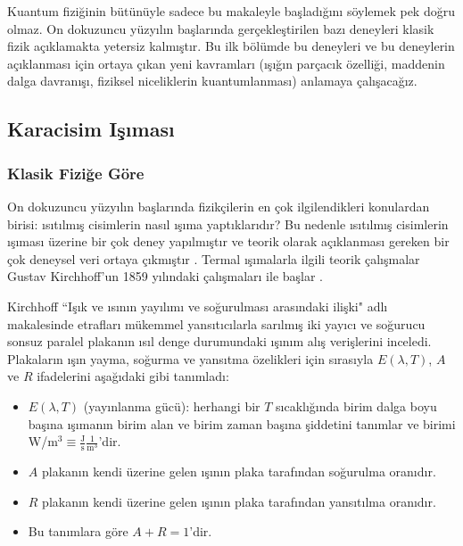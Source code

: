 \documentclass[a4paper,12pt, twoside]{article}
\begin{document}
Kuantum fiziğinin bütünüyle sadece bu makaleyle başladığını söylemek pek doğru olmaz. On dokuzuncu yüzyılın başlarında gerçekleştirilen bazı deneyleri klasik fizik açıklamakta yetersiz kalmıştır. Bu ilk bölümde bu deneyleri ve bu deneylerin açıklanması için ortaya çıkan yeni kavramları (ışığın parçacık özelliği, maddenin dalga davranışı, fiziksel niceliklerin kuantumlanması) anlamaya çalışacağız. 


\subsection{Karacisim Işıması}



\subsubsection{Klasik Fiziğe Göre}
On dokuzuncu yüzyılın başlarında fizikçilerin en çok ilgilendikleri konulardan birisi:
ısıtılmış cisimlerin nasıl ışıma yaptıklarıdır? Bu nedenle ısıtılmış cisimlerin ışıması üzerine bir çok deney yapılmıştır ve teorik olarak açıklanması gereken bir çok deneysel veri ortaya çıkmıştır \cite{book:Sharkov}. Termal ışımalarla ilgili teorik çalışmalar Gustav Kirchhoff'un 1859 yılındaki çalışmaları ile başlar \cite{book:Gasiorowicz}. 

Kirchhoff ``Işık ve ısının yayılımı ve soğurulması arasındaki ilişki" \cite{book:Jammer, Kirchhoff1859} adlı makalesinde etrafları mükemmel yansıtıcılarla sarılmış iki yayıcı ve soğurucu sonsuz paralel plakanın ısıl denge durumundaki ışınım alış verişlerini inceledi. Plakaların ışın yayma, soğurma ve yansıtma özelikleri için sırasıyla $E(\lambda, T)$, $A$ ve $R$ ifadelerini aşağıdaki gibi tanımladı:

\begin{itemize}
\item $E(\lambda, T)$ (yayınlanma gücü): herhangi bir $T$ sıcaklığında  birim dalga boyu başına ışımanın birim alan ve birim zaman başına şiddetini tanımlar ve birimi W/m$^3\equiv \frac{\text{J}}{\text{s}} \frac{1}{\text{m}^3}$'dir.
\item $A$ plakanın kendi üzerine gelen ışının plaka tarafından soğurulma oranıdır.
\item $R$ plakanın kendi üzerine gelen ışının plaka tarafından yansıtılma  oranıdır.
\item Bu tanımlara göre $A + R = 1$'dir.
\end{itemize}
\end{document}
